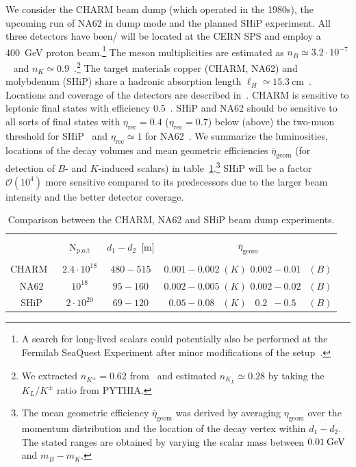 \documentclass[preprintnumbers,twocolumn,aps,floats,nofootinbib]{revtex4-1}
\newcommand{\eVdist}{\kern-0.06em}
\newcommand{\gev}{\:\text{Ge\eVdist V}}
\begin{document}
We consider the CHARM beam dump (which operated in the 1980s), the upcoming run of NA62 in dump mode and the planned SHiP experiment. All three detectors have been/ will be located at the CERN SPS and employ a 400~GeV proton beam.\footnote{A search for long-lived scalars could potentially also be performed at the Fermilab SeaQuest Experiment after minor modifications of the setup~\cite{Berlin:2018pwi}.} The meson multiplicities are estimated as $n_B\simeq 3.2\cdot 10^{-7}$~\cite{Anelli:2015pba} and $n_K\simeq 0.9$~\cite{Antinucci:1972ib}.\footnote{We extracted $n_{K^\pm}=0.62$ from~\cite{Antinucci:1972ib} and estimated $n_{K_L}\simeq 0.28$ by taking the $K_L/K^\pm$ ratio from PYTHIA.}
The target materials copper (CHARM, NA62) and molybdenum (SHiP) share a hadronic absorption length $\ell_H\simeq 15.3\:\text{cm}$~\cite{Groom:2017}. Locations and coverage of the detectors are described in~\cite{Bergsma:1985qz,NA62:2017rwk,Anelli:2015pba}. CHARM is sensitive to leptonic final states with efficiency 0.5~\cite{Bergsma:1985qz}. SHiP and NA62 should be sensitive to all sorts of final states with $\eta_{\text{rec}}=0.4$ ($\eta_{\text{rec}}=0.7$)
below (above) the two-muon threshold for SHiP~\cite{Anelli:2015pba} and $\eta_{\text{rec}}\simeq1$ for NA62~\cite{Lanfranchi:2017wzl}. We summarize the luminosities, locations of the decay volumes and mean geometric efficiencies $\overline{\eta}_{\text{geom}}$ (for detection of $B$- and $K$-induced scalars) in table~\ref{tab:beamdumps}.\footnote{The mean geometric efficiency $\overline{\eta}_{\text{geom}}$ was derived by averaging $\eta_{\text{geom}}$ over the momentum distribution and the location of the decay vertex within $d_1-d_2$. The stated ranges are obtained by varying the scalar mass between $0.01\gev$ and $m_B-m_K$.} SHiP will be a factor $\mathcal{O}(10^4)$ more sensitive compared to its predecessors due to the larger beam intensity and the better detector coverage.
\begin{table}[t]
\begin{center}
\begin{tabular}{|cccc|}
\hline
 &   &  &     \\[-4mm]
  & $\text{N}_{\text{p.o.t}}$ & $d_1-d_2$~[m] & $\overline{\eta}_{\text{geom}}$  \\[1mm]
\hline \hline
  &   & &\\[-3mm]
 CHARM$\;\;$    &  $2.4\cdot 10^{18}$ & $480-515$ & \parbox{3cm}{$0.001-0.002\;(K)$\\$0.002-0.01\phantom{0}\;(B)$} \\[3mm]
 NA62    &  $10^{18}$ & $95-160$ & \parbox{3cm}{$0.002-0.005\;(K)$\\$0.002-0.02\phantom{0}\;(B)$} \\[3mm]
 SHiP    &  $2\cdot 10^{20}$ & $69-120$ & \parbox{3cm}{$\phantom{0}0.05-0.08\phantom{0}\;(K)$\\$\phantom{0}0.2\phantom{0}-0.5\phantom{0}\phantom{0}\;(B)$}  \\[2mm]
 \hline
\end{tabular}
\end{center}
\caption{Comparison between the CHARM, NA62 and SHiP beam dump experiments.}
\label{tab:beamdumps}
\end{table}
\end{document}
